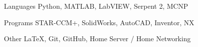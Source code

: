 
\begin{cvskills}
  \cvskill
    {Languages} %
    {Python, MATLAB, LabVIEW, Serpent 2, MCNP} %

  \cvskill
    {Programs} %
    {STAR-CCM+, SolidWorks, AutoCAD, Inventor, NX} %
    
  \cvskill
    {Other} %
    {\LaTeX, Git, GitHub, Home Server / Home Networking} %
\end{cvskills}
